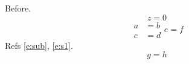 \documentclass[10pt]{article}
\begin{document}
Before.
\begin{equation} z = 0 \end{equation}
\begin{subequations}\label{e:sub}
\begin{align} a &= b \label{e:s1}\\ c &= d \end{align}
\begin{equation} e = f \end{equation}
\end{subequations}
Refs \eqref{e:sub}, \eqref{e:s1}.
\begin{equation} g = h \end{equation}
\end{document}
